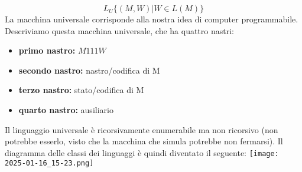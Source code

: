 	$$L_U\{(M,W)|W\in L(M)\}$$
	La macchina universale corrisponde alla nostra idea di computer programmabile. Descriviamo
	questa macchina universale, che ha quattro nastri:
	\begin{itemize}
		\item \textbf{primo nastro:} $M111W$
		\item \textbf{secondo nastro:} nastro/codifica di M
		\item \textbf{terzo nastro:} stato/codifica di M
		\item \textbf{quarto nastro:} ausiliario

	\end{itemize}
	Il linguaggio universale è ricorsivamente enumerabile ma non ricorsivo (non potrebbe esserlo, visto
	che la macchina che simula potrebbe non fermarsi).
	Il diagramma delle classi dei linguaggi è quindi diventato il seguente:
			\texttt{[image: 2025-01-16\_15-23.png]}
